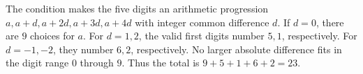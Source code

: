 The condition makes the five digits an arithmetic progression $a,a+d,a+2d,a+3d,a+4d$ with integer common difference $d$. If $d=0$, there are $9$ choices for $a$. For $d=1,2$, the valid first digits number $5,1$, respectively. For $d=-1,-2$, they number $6,2$, respectively. No larger absolute difference fits in the digit range $0$ through $9$. Thus the total is $9+5+1+6+2=\boxed{23}$.
